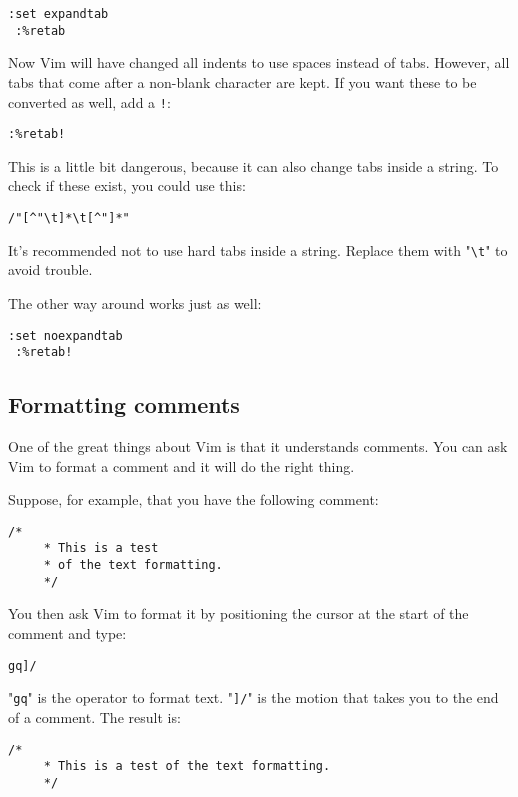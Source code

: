 \begin{Verbatim}[samepage=true]
 :set expandtab
 :%retab
\end{Verbatim}

Now Vim will have changed all indents to use spaces instead of tabs.
However, all tabs that come after a non-blank character are kept.
If you want these to be converted as well, add a \verb,!,:

\begin{Verbatim}[samepage=true]
 :%retab!
\end{Verbatim}

This is a little bit dangerous, because it can also change tabs inside a string.
To check if these exist, you could use this:

\begin{Verbatim}[samepage=true]
 /"[^"\t]*\t[^"]*"
\end{Verbatim}

It's recommended not to use hard tabs inside a string.
Replace them with "\verb!\t!" to avoid trouble.

The other way around works just as well:

\begin{Verbatim}[samepage=true]
 :set noexpandtab
 :%retab!
\end{Verbatim}
\subsection{Formatting comments}
One of the great things about Vim is that it understands comments.
You can ask Vim to format a comment and it will do the right thing.

Suppose, for example, that you have the following comment:

\begin{Verbatim}[samepage=true]
    /* 
     * This is a test 
     * of the text formatting. 
     */ 
\end{Verbatim}

You then ask Vim to format it by positioning the cursor at the start of the comment and type:

\begin{Verbatim}[samepage=true]
 gq]/
\end{Verbatim}

"\verb!gq!" is the operator to format text.
"\verb!]/!" is the motion that takes you to the end of a comment.
The result is:

\begin{Verbatim}[samepage=true]
    /* 
     * This is a test of the text formatting. 
     */ 
\end{Verbatim}

